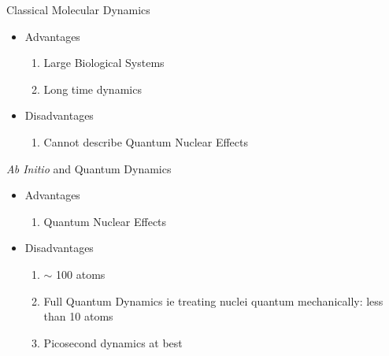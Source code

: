 \documentclass[slidestop,mathserif,compress,xcolor=svgnames]{beamer}
\begin{document}
\begin{frame}
\begin{block}{Classical Molecular Dynamics}
\begin{itemize}
\item Advantages
{\scriptsize
\begin{enumerate}
\item Large Biological Systems
\item Long time dynamics
\end{enumerate}
}
\item Disadvantages
{\footnotesize
\begin{enumerate}
\item Cannot describe Quantum Nuclear Effects
\end{enumerate}
}
\end{itemize}
\end{block}
\begin{block}{\textit{Ab Initio} and Quantum Dynamics}
\begin{itemize}
\item Advantages
{\footnotesize
\begin{enumerate}
\item Quantum Nuclear Effects
\end{enumerate}
}
\item Disadvantages
{\footnotesize
\begin{enumerate}
\item $\sim$ 100 atoms
\item Full Quantum Dynamics ie treating nuclei quantum mechanically: less than 10 atoms
\item Picosecond dynamics at best
\end{enumerate}
}
\end{itemize}
\end{block}
\end{frame}
\end{document}
